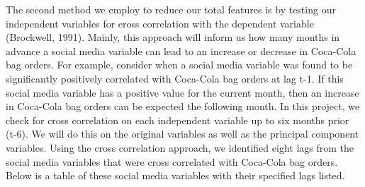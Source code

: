 \documentclass[12pt,oneside]{chicagocapstone}
\begin{document}
The second method we employ to reduce our total features is by testing our independent variables for cross correlation with the dependent variable (Brockwell, 1991). Mainly, this approach will inform us how many months in advance a social media variable can lead to an increase or decrease in Coca-Cola bag orders. For example, consider when a social media variable was found to be significantly positively correlated with Coca-Cola bag orders at lag t-1. If this social media variable has a positive value for the current month, then an increase in Coca-Cola bag orders can be expected the following month. In this project, we check for cross correlation on each independent variable up to six months prior (t-6). We will do this on the original variables as well as the principal component variables. Using the cross correlation approach, we identified eight lags from the social media variables that were cross correlated with Coca-Cola bag orders. Below is a table of these social media variables with their specified lags listed.
\end{document}
